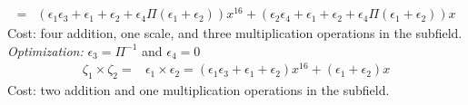 \begin{itemize}
\begin{align*}
	= & (\epsilon_1\epsilon_3 + \epsilon_1 + \epsilon_2 + \epsilon_4\Pi(\epsilon_1 + \epsilon_2)) x^{16} + (\epsilon_2\epsilon_4 + \epsilon_1 + \epsilon_2 + \epsilon_4\Pi(\epsilon_1 + \epsilon_2)) x
	\end{align*} 
	Cost: four addition, one scale, and three multiplication operations in the subfield. \\
	\emph{Optimization:} $\epsilon_3 = \Pi^{-1}$ and $\epsilon_4 = 0$
	\begin{align*}
	\zeta_1 \times \zeta_2 = & \epsilon_1 \times \epsilon_2 = (\epsilon_1\epsilon_3 + \epsilon_1 + \epsilon_2) x^{16} + (\epsilon_1 + \epsilon_2) x 
	\end{align*}
	Cost: two addition and one multiplication operations in the subfield.


\end{itemize}

